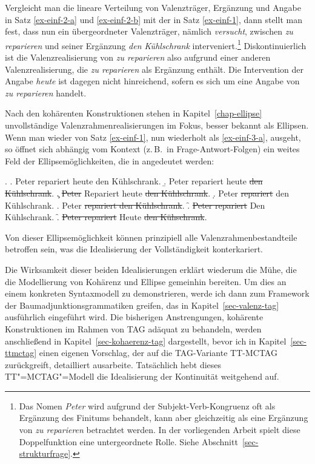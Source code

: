 Vergleicht man die lineare Verteilung von Valenzträger, Ergänzung und Angabe in Satz \ref{ex-einf-2-a} und \ref{ex-einf-2-b} mit der in Satz \ref{ex-einf-1}, dann stellt man fest, dass nun ein übergeordneter Valenzträger, nämlich {\it versucht}, zwischen \textit{zu reparieren} und seiner Ergänzung \textit{den Kühlschrank} interveniert.\footnote{Das Nomen {\it Peter} wird aufgrund der Subjekt-Verb-Kongruenz oft als Ergänzung des Finitums behandelt, kann aber gleichzeitig als eine Ergänzung von {\it zu reparieren} betrachtet werden. In der vorliegenden Arbeit spielt diese Doppelfunktion eine untergeordnete Rolle. Siehe Abschnitt~\ref{sec-strukturfrage}.}  Diskontinuierlich ist die Valenzrealisierung von \textit{zu reparieren} also aufgrund einer anderen Valenzrealisierung, die \textit{zu reparieren} als Ergänzung enthält. Die Intervention der Angabe \textit{heute} ist dagegen nicht hinreichend, sofern es sich um eine Angabe von \textit{zu reparieren} handelt.

Nach den kohärenten Konstruktionen stehen in Kapitel~\ref{chap-ellipse} unvollständige Valenzrahmenrealisierungen im Fokus, besser bekannt als Ellipsen. Wenn man wieder von Satz \ref{ex-einf-1}, nun wiederholt als \ref{ex-einf-3-a}, ausgeht, so öffnet sich abhängig vom Kontext (z.\,B.\ in Frage-Antwort-Folgen) ein weites Feld der Ellipsemöglichkeiten, die in \Next[b--g] angedeutet werden:       
  
  \ex. \label{ex-einf-3}
  \a. \label{ex-einf-3-a} Peter repariert heute den Kühlschrank. 
  \b. \label{ex-einf-3-b} Peter repariert heute \sout{den Kühlschrank}.
  \c. \sout{Peter} Repariert heute \sout{den Kühlschrank}.
  \d. Peter \sout{repariert} den Kühlschrank.
  \e. Peter \sout{repariert den Kühlschrank}.
  \f. \sout{Peter repariert} Den Kühlschrank.
  \f. \label{ex-einf-3-f} \sout{Peter repariert} Heute \sout{den Kühschrank}.

Von dieser Ellipsemöglichkeit können prinzipiell alle Valenzrahmenbestandteile betroffen sein, was die Idealisierung der Vollständigkeit konterkariert. 

\enlargethispage{1mm}
Die Wirksamkeit dieser beiden Idealisierungen erklärt wiederum die Mühe, die die Modellierung von Kohärenz und Ellipse gemeinhin bereiten. Um dies an einem konkreten Syntaxmodell zu demonstrieren, werde ich dann zum Framework der Baumadjunktionsgrammatiken greifen, das in Kapitel~\ref{sec-valenz-tag} ausführlich eingeführt wird. Die bisherigen Anstrengungen, kohärente Konstruktionen im Rahmen von TAG adäquat zu behandeln, werden anschlie\ss end in Kapitel~\ref{sec-kohaerenz-tag} dargestellt, bevor ich in Kapitel~\ref{sec-ttmctag} einen eigenen Vorschlag, der auf die TAG-Variante TT-MCTAG zurückgreift, detailliert ausarbeite. Tatsächlich hebt dieses TT"=MCTAG"=Modell die Idealisierung der Kontinuität weitgehend auf. 

